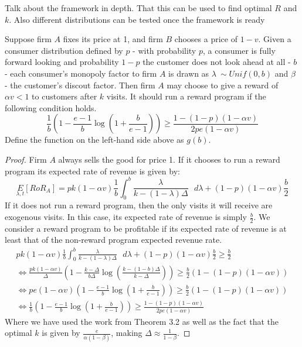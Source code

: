 {\arpit Talk about the framework in depth. That this can be used to find optimal $R$ and $k$. Also different distributions can be tested once the framework is ready}

\begin{theorem}
Suppose firm $A$ fixes its price at 1, and firm $B$ chooses a price of $1-v$. Given a consumer distribution defined by $p$ - with probability $p$, a consumer is fully forward looking and probability $1-p$ the customer does not look ahead at all - $b$ - each consumer's monopoly factor to firm $A$ is drawn as $\lambda~\sim Unif(0,b)$ and $\beta$ - the customer's discout factor. Then firm $A$ may choose to give a reward of $\alpha v < 1$ to customers after $k$ visits. It should run a reward program if the following condition holds.
\begin{equation}
\frac{1}{b}\left(1-\frac{e-1}{b}\log \left(1+\frac{b}{e-1} \right) \right) \geq \frac{1-(1-p)(1-\alpha v)}{2pe(1-\alpha v)}
\end{equation}
Define the function on the left-hand side above as $g(b)$.
\end{theorem}

\begin{proof}
Firm $A$ always sells the good for price 1. If it chooses to run a reward program its expected rate of revenue is given by:
\begin{equation*}
\underset{\lambda, t}E[RoR_A] = pk(1-\alpha v)\frac{1}{b}\int_0^b \frac{\lambda}{k-(1-\lambda)\Delta} \mbox{ } d\lambda + (1-p)(1-\alpha v)\frac{b}{2}
\end{equation*}
If it does not run a reward program, then the only visits it will receive are exogenous visits. In this case, its expected rate of revenue is simply $\frac{b}{2}$. We consider a reward program to be profitable if its expected rate of revenue is at least that of the non-reward program expected revenue rate.
\begin{gather*}
pk(1-\alpha v)\frac{1}{b}\int_0^b \frac{\lambda}{k-(1-\lambda)\Delta} \mbox{ } d\lambda + (1-p)(1-\alpha v)\frac{b}{2} \geq \frac{b}{2} \\
\iff \frac{pk(1-\alpha v)}{\Delta}\left(1-\frac{k-\Delta}{b\Delta}\log \left(\frac{k-(1-b)\Delta}{k-\Delta} \right) \right) \geq \frac{b}{2}(1-(1-p)(1-\alpha v)) \\
\iff pe(1-\alpha v)\left(1-\frac{e-1}{b}\log \left(1+\frac{b}{e-1} \right) \right) \geq \frac{b}{2}(1-(1-p)(1-\alpha v)) \\
\iff \frac{1}{b}\left(1-\frac{e-1}{b}\log \left(1+\frac{b}{e-1} \right) \right) \geq \frac{1-(1-p)(1-\alpha v)}{2pe(1-\alpha v)}
\end{gather*}
Where we have used the work from Theorem 3.2 as well as the fact that the optimal $k$ is given by $\frac{e}{\alpha(1-\beta)}$, making $\Delta \approx \frac{1}{1-\beta}$. 
\end{proof}

